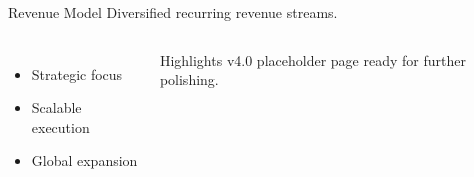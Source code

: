 
\begin{frame}{Revenue Model}
\vspace{0.3cm}
{\large Diversified recurring revenue streams.}

\vspace{0.6cm}
\begin{columns}[T]
\begin{itemize}
\item Strategic focus
\item Scalable execution
\item Global expansion
\end{itemize}
\begin{block}{Highlights}
v4.0 placeholder page ready for further polishing.
\end{block}
\end{columns}
\end{frame}
